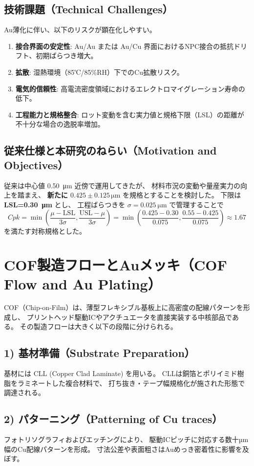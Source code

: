 \documentclass[conference]{IEEEtran}
\begin{document}
\subsection*{技術課題（Technical Challenges）}
Au薄化に伴い、以下のリスクが顕在化しやすい。
\begin{enumerate}
  \item \textbf{接合界面の安定性}: Au/Au または Au/Cu 界面におけるNPC接合の抵抗ドリフト、初期ばらつき増大。
  \item \textbf{拡散}: 湿熱環境（85℃/85\%RH）下でのCu拡散リスク。
  \item \textbf{電気的信頼性}: 高電流密度領域におけるエレクトロマイグレーション寿命の低下。
  \item \textbf{工程能力と規格整合}: ロット変動を含む実力値と規格下限（LSL）の距離が不十分な場合の逸脱率増加。
\end{enumerate}

\subsection*{従来仕様と本研究のねらい（Motivation and Objectives）}
従来は中心値 \SI{0.50}{\micro\meter} 近傍で運用してきたが、
材料市況の変動や量産実力の向上を踏まえ、
\textbf{新たに $0.425 \pm 0.125\,\si{\micro\meter}$} を規格とすることを検討した。
下限は \textbf{LSL=\SI{0.30}{\micro\meter}} とし、
工程ばらつきを \(\sigma=\SI{0.025}{\micro\meter}\) で管理することで
\[
Cpk=\min\!\left(\frac{\mu-\mathrm{LSL}}{3\sigma},\frac{\mathrm{USL}-\mu}{3\sigma}\right)
=\min\!\left(\frac{0.425-0.30}{0.075},\frac{0.55-0.425}{0.075}\right)\approx1.67
\]
を満たす対称規格とした。

\section{COF製造フローとAuメッキ（COF Flow and Au Plating）}
COF（Chip-on-Film）は、薄型フレキシブル基板上に高密度の配線パターンを形成し、
プリントヘッド駆動ICやアクチュエータを直接実装する中核部品である。
その製造フローは大きく以下の段階に分けられる。

\subsection*{1) 基材準備（Substrate Preparation）}
基材には CLL (Copper Clad Laminate) を用いる。
CLLは銅箔とポリイミド樹脂をラミネートした複合材料で、
打ち抜き・テープ幅規格化が施された形態で調達される。

\subsection*{2) パターニング（Patterning of Cu traces）}
フォトリソグラフィおよびエッチングにより、
駆動ICピッチに対応する数十µm幅のCu配線パターンを形成。
寸法公差や表面粗さはAuめっき密着性に影響を及ぼす。
\end{document}
